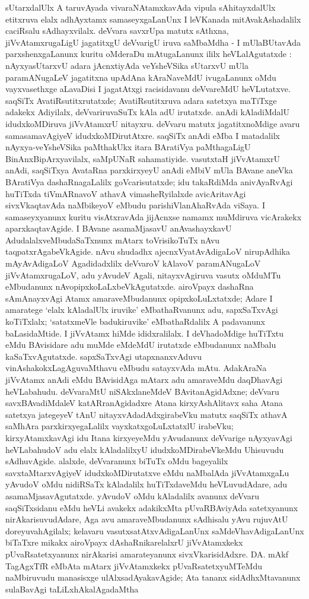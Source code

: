 sUtarxdalUlx A taruvAyada vivaraNAtamxkavAda vipula sAhitayxdalUlx etitx\-ruva elalx adhAyxtamx samaseyxgaLanUnx I leVKanada mitAvakAshadalilx caciRsalu sAdhayxvilalx. deVvara savxrUpa matutx sAthxna, jiVvAtamxrugaLigU jagatitxgU deVvarigU iruva saMbaMdha - I mUlaBUtavAda parxshenxgaLanunx kuritu oMderaDu mAtugaLanunx ililx heVLalAgutatxde : nAyxyasUtarxvU adara jAcnxtiyAda veYsheVSika sUtarxvU mUla para\-mANugaLeV jagatitxna upAdAna kAraNaveMdU ivugaLanunx oMdu vayxvasethxge aLavaDisi I jagatAtxgi racisidavanu deVvareMdU heVLutatxve. saqSiTx AvatiR\-su\-titxrutatxde; AvatiRsu\-titxruva adara satetxya maTiTxge adakekx Adiyilalx, deVvariruvaSuTx kAla adU iru\-tatxde. anAdi kAladiMdalU idudxkoMDiruva jiVvAtamxrU nitayxru. deVvaru matutx jagatitx\-noMdige avaru samasamavAgiyeV idudxkoMDirutAtxre. saqSiTx anAdi eMba I matadalilx nAyxya-veYsheVSika paMthakUkx itara BAratiVya paMthagaLigU BinAnxBipArxya\-vilalx, saMpUNaR sahamatiyide. vasutxtaH jiVvAtamxrU anAdi, saqSiTxya AvataRna parxkirxyeyU anAdi eMbiV mUla BAvane aneVka BAratiVya dashaRnagaLalilx goVcari\-sutatxde; idu takaRdiMda anivAyaRvAgi huTiTxda tiVmARnavoV athavA vimasheR\-yilalxde avicAritavAgi sivxVkaqtavAda naMbikeyoV eMbudu parishiVlanAhaRvAda viSaya. I samaseyxyanunx kuritu visAtxravAda jijAcnxse namamx muMdiruva vicArakekx aparxkaqtavAgide. I BAvane asamaMjasavU anAvashayxkavU AdudalalxveMbudaSaTxnunx mAtarx toVrisikoTuTx nAvu taqpatxrAgabeVkAgide. nAvu shudadhx ajecnxVyatAvAdigaLoV nirupAdhika mAyAvAdigaLoV  Agadidadxlilx deVvaroV kAlavoV paramANugaLoV jiVvAtamxrugaLoV, adu yAvudeV Agali, nitayxvAgiruva vasutx oMduMTu eMbudanunx nAvopipxkoLaLxbeVkAgutatxde. airoVpayx dashaRna sAmAnayxvAgi Atamx amaraveMbudanunx opipxkoLuLxtatxde; Adare I amaratege `elalx kAladalUlx iruvike' eMbathaRvanunx adu, sapxSaTxvAgi koTiTxlalx; `satatxmeVle badukiruvike' eMbathaRdalilx A padavanunx baLasidaMtide. I jiVvAtamx hiMde ididxralilalx. I deVhadoMdige huTiTxtu eMdu BAvisidare adu muMde eMdeMdU irutatxde eMbudanunx naMbalu kaSaTxvAgutatxde. sapxSaTxvAgi utapxnanxvAduvu vinAshakokxLagAguvaMthavu eMbudu satayxvAda mAtu. AdakAraNa jiVvAtamx anAdi eMdu BAvisidAga mAtarx adu amaraveMdu daqDhavAgi heVLabahudu. deVvaraMtU niSAkxlaneMdeV BAvitanAgidAdxne; deVvaru savxBAvadiMdaleV katARranAgidadxre Atana kirxyAshAlitavx saha Atana satetxya jategeyeV tAnU nitayxvAdadAdxgirabeVku matutx saqSiTx athavA saMhAra parxkirxyegaLalilx vayxkatxgoLuLxtatxlU irabeVku; kirxyAtamxkavAgi idu Itana kirxyeyeMdu yAvudanunx deVvarige nAyxyavAgi heVLabahudoV adu elalx kAladalilxyU idudxkoMDirabeVkeMdu Uhisuvudu sAdhuvAgide. alalxde, deVvaranunx biTuTx oMdu bageyalilx savxtaMtarxvAgiyeV idudxkoMDirutatxve eMdu naMbalAda jiVvAtamxgaLu yAvudoV oMdu nidiRSaTx kAladalilx huTiTxdaveMdu heVLuvudAdare, adu asamaMjasavAgutatxde. yAvudoV oMdu kAladalilx avanunx deVvaru saqSiTxsidanu eMdu heVLi avakekx adakikxMta pUvaRBAviyAda satetxyanunx nirAkarisuvudAdare, Aga avu amaraveMbudanunx sAdhisalu yAvu rujuvAtU doreyuvahAgilalx; kelavaru vasutxsatAtxvAdigaLanUnx saMdeVhavAdigaLanUnx biTaTxre mikakx airoVpayx dAshaRnikarelalxrU jiVvAtamxkekx pUvaRsatetxyanunx nirAkarisi amarateyanunx sivxVkarisidAdxre. DA. mAkf TagAgxTfR eMbAta mAtarx jiVvAtamxkekx pUvaRsatetxyuMTeMdu naMbiruvudu manasisxge ulAlxsadAyakavAgide; Ata tananx sidAdhxMtavanunx sulaBavAgi taLiLxhAkalAgadaMtha 